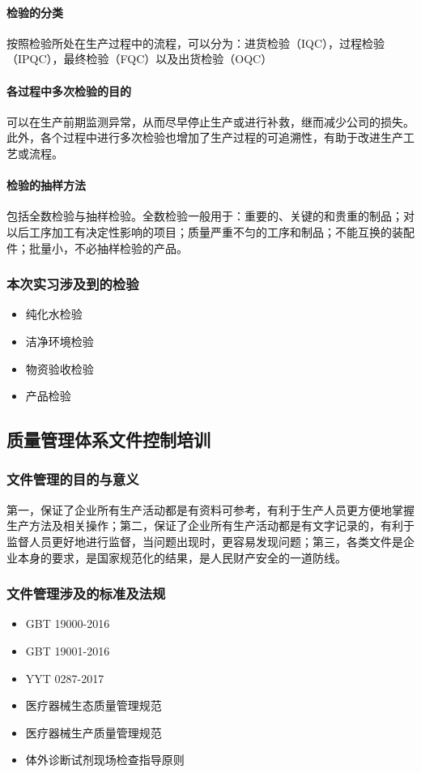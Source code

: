 \documentclass[cn,black,12pt,normal]{elegantnote}
\begin{document}
\paragraph{检验的分类} 按照检验所处在生产过程中的流程，可以分为：进货检验（IQC），过程检验（IPQC），最终检验（FQC）以及出货检验（OQC）

\paragraph{各过程中多次检验的目的} 可以在生产前期监测异常，从而尽早停止生产或进行补救，继而减少公司的损失。此外，各个过程中进行多次检验也增加了生产过程的可追溯性，有助于改进生产工艺或流程。

\paragraph{检验的抽样方法} 包括全数检验与抽样检验。全数检验一般用于：重要的、关键的和贵重的制品；对以后工序加工有决定性影响的项目；质量严重不匀的工序和制品；不能互换的装配件；批量小，不必抽样检验的产品。

\subsubsection{本次实习涉及到的检验}
\begin{itemize}
    \item 纯化水检验
    \item 洁净环境检验
    \item 物资验收检验
    \item 产品检验
\end{itemize}

\subsection{质量管理体系文件控制培训}

\subsubsection{文件管理的目的与意义} 第一，保证了企业所有生产活动都是有资料可参考，有利于生产人员更方便地掌握生产方法及相关操作；第二，保证了企业所有生产活动都是有文字记录的，有利于监督人员更好地进行监督，当问题出现时，更容易发现问题；第三，各类文件是企业本身的要求，是国家规范化的结果，是人民财产安全的一道防线。

\subsubsection{文件管理涉及的标准及法规}
\begin{itemize}
    \item GBT 19000-2016
    \item GBT 19001-2016
    \item YYT 0287-2017
    \item 医疗器械生态质量管理规范
    \item 医疗器械生产质量管理规范
    \item 体外诊断试剂现场检查指导原则
\end{itemize}
\end{document}
